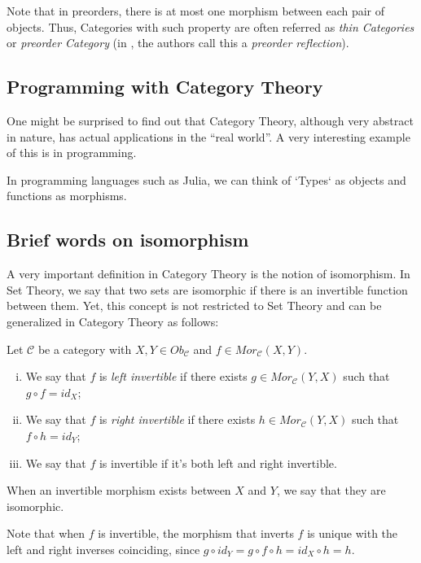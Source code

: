 Note that in preorders, there is at most one morphism between each pair of objects.
Thus, Categories with such property are often referred as \textit{thin Categories}
or \textit{preorder Category} (in \citet{fong2019invitation}, the authors call this
a \textit{preorder reflection}).

\subsection{Programming with Category Theory}

One might be surprised to find out that Category Theory,
although very abstract in nature, has actual applications in the
``real world''. A very interesting example of this is in programming.

In programming languages such as Julia, we can think of `Types`
as objects and functions as morphisms.

\subsection{Brief words on isomorphism}

A very important definition in Category Theory is the notion of isomorphism.
In Set Theory, we say that two sets are isomorphic if there is an invertible
function between them. Yet, this concept is not restricted to Set Theory
and can be generalized in Category Theory as follows:

\begin{definition}
  Let $\mathcal C$ be a category with $X,Y \in Ob_\mathcal C$ and $f \in Mor_\mathcal C (X,Y)$.
  \begin{enumerate}[(i)]
    \item We say that $f$ is \textit{left invertible} if there exists $g \in Mor_\mathcal C (Y,X)$ such
      that $g \circ f = id_X$;
    \item We say that $f$ is \textit{right invertible} if there exists $h \in Mor_\mathcal C (Y,X)$ such
      that $f \circ h = id_Y$;
    \item We say that $f$ is invertible if it's both left and right invertible.
  \end{enumerate}
  When an invertible morphism exists between $X$ and $Y$, we say that they are isomorphic.
\end{definition}
Note that when $f$ is invertible, the morphism that inverts $f$ is unique with the left and
right inverses coinciding, since
$g \circ id_Y = g \circ f \circ h = id_X \circ h = h$.



